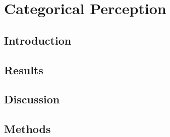 \chapter{Categorical Perception}
\section{Introduction}


\section{Results}


\section{Discussion}


\section{Methods}


\renewcommand{\figurename}{Supplementary Figure}

\renewcommand{\figurename}{Figure}
